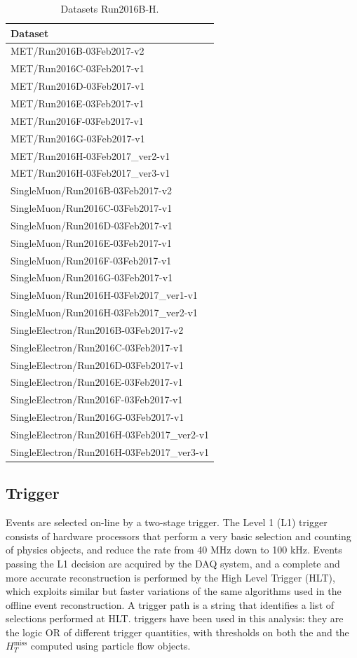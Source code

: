 \begin{table}[!htb]
\centering
  \caption{Datasets Run2016B-H.\label{tab:datasets}}
 \begin{tabular}{l} 
 \hline
 Dataset \\
 \hline
 MET/Run2016B-03Feb2017-v2 \\
 MET/Run2016C-03Feb2017-v1 \\
 MET/Run2016D-03Feb2017-v1 \\
 MET/Run2016E-03Feb2017-v1 \\
 MET/Run2016F-03Feb2017-v1 \\
 MET/Run2016G-03Feb2017-v1 \\
 MET/Run2016H-03Feb2017\_ver2-v1 \\
 MET/Run2016H-03Feb2017\_ver3-v1 \\
 \hline
 SingleMuon/Run2016B-03Feb2017-v2 \\
 SingleMuon/Run2016C-03Feb2017-v1 \\
 SingleMuon/Run2016D-03Feb2017-v1 \\
 SingleMuon/Run2016E-03Feb2017-v1 \\
 SingleMuon/Run2016F-03Feb2017-v1 \\
 SingleMuon/Run2016G-03Feb2017-v1 \\
 SingleMuon/Run2016H-03Feb2017\_ver1-v1 \\
 SingleMuon/Run2016H-03Feb2017\_ver2-v1 \\
 \hline
 SingleElectron/Run2016B-03Feb2017-v2 \\
 SingleElectron/Run2016C-03Feb2017-v1 \\
 SingleElectron/Run2016D-03Feb2017-v1 \\
 SingleElectron/Run2016E-03Feb2017-v1 \\
 SingleElectron/Run2016F-03Feb2017-v1 \\
 SingleElectron/Run2016G-03Feb2017-v1 \\
 SingleElectron/Run2016H-03Feb2017\_ver2-v1 \\
 SingleElectron/Run2016H-03Feb2017\_ver3-v1 \\
 \hline
 \end{tabular}
\end{table}

\clearpage

\subsection{Trigger}\label{ssec:trigger}

Events are selected on-line by a two-stage trigger. The Level 1 (L1) trigger consists of hardware processors that perform a very basic selection and counting of physics objects, and reduce the rate from 40 MHz down to 100 kHz. Events passing the L1 decision are acquired by the DAQ system, and a complete and more accurate reconstruction is performed by the High Level Trigger (HLT), which exploits similar but faster variations of the same algorithms used in the offline event reconstruction. A trigger path is a string that identifies a list of selections performed at HLT.
\met triggers have been used in this analysis: they are the logic OR of different trigger quantities, with thresholds on both the \met and the ${H}_T^{\text{miss}}$ computed using particle flow objects. 

